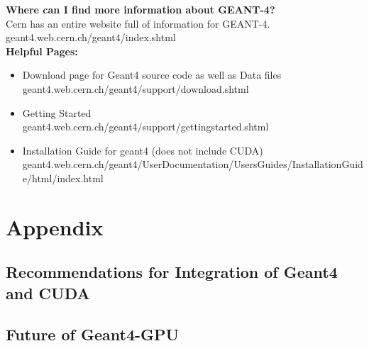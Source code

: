 \documentclass[12pt]{article}
\begin{document}
\textbf{Where can I find more information about GEANT-4?}\\
Cern has an entire website full of information for GEANT-4.\\ geant4.web.cern.ch/geant4/index.shtml\\

\textbf{Helpful Pages:}
\begin{itemize}
\item Download page for Geant4 source code as well as Data files\\ geant4.web.cern.ch/geant4/support/download.shtml
\item Getting Started\\ geant4.web.cern.ch/geant4/support/gettingstarted.shtml
\item Installation Guide for geant4 (does not include CUDA)\\ geant4.web.cern.ch/geant4/UserDocumentation/UsersGuides/InstallationGuide/html/index.html
\end{itemize}

\section{Appendix} %
\subsection{Recommendations for Integration of Geant4 and CUDA}
\subsection{Future of Geant4-GPU}
\end{document}
